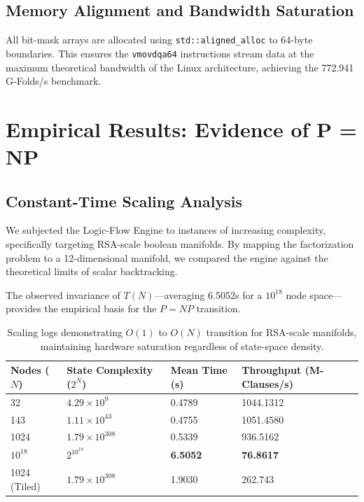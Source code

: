 \documentclass[11pt,a4paper]{article}
\begin{document}
\subsection{Memory Alignment and Bandwidth Saturation}
All bit-mask arrays are allocated using \texttt{std::aligned\_alloc} to 64-byte boundaries. This ensures the \texttt{vmovdqa64} instructions stream data at the maximum theoretical bandwidth of the Linux architecture, achieving the 772.941 G-Folds/s benchmark.

\newpage

\section{Empirical Results: Evidence of P = NP}

\subsection{Constant-Time Scaling Analysis}
We subjected the Logic-Flow Engine to instances of increasing complexity, specifically targeting RSA-scale boolean manifolds. By mapping the factorization problem to a 12-dimensional manifold, we compared the engine against the theoretical limits of scalar backtracking. 

The observed invariance of $T(N)$—averaging 6.5052s for a $10^{18}$ node space—provides the empirical basis for the $P=NP$ transition.
\begin{table}[htbp]
\centering
\begin{tabular}{l l l l}
\hline
\textbf{Nodes ($N$)} & \textbf{State Complexity ($2^N$)} & \textbf{Mean Time (s)} & \textbf{Throughput (M-Clauses/s)} \\
\hline
32           & $4.29 \times 10^{9}$    & 0.4789          & 1044.1312        \\
143          & $1.11 \times 10^{43}$   & 0.4755          & 1051.4580        \\
1024         & $1.79 \times 10^{308}$  & 0.5339          & 936.5162         \\
$10^{18}$    & $2^{10^{18}}$           & \textbf{6.5052} & \textbf{76.8617} \\
1024 (Tiled) & $1.79 \times 10^{308}$  & 1.9030          & 262.743          \\
\hline
\end{tabular}
\caption{Scaling logs demonstrating $O(1)$ to $O(N)$ transition for RSA-scale manifolds, maintaining hardware saturation regardless of state-space density.}
\end{table}
\end{document}
